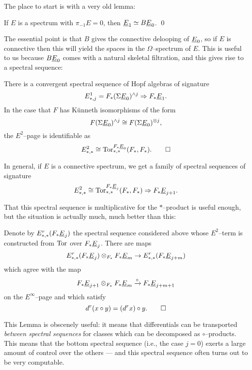 The place to start is with a very old lemma:
\begin{lemma}
If $E$ is a spectrum with $\pi_{-1} E = 0$, then $\underline{\smash{E}}_{1} \simeq B\underline{\smash{E}}_{0}$. \qed
\end{lemma}
\noindent The essential point is that $B$ gives the connective delooping of $\underline{\smash{E}}_{0}$, so if $E$ is connective then this will yield the spaces in the $\Omega$--spectrum of $E$.  This is useful to us because $B\underline{\smash{E}}_{0}$ comes with a natural skeletal filtration, and this gives rise to a spectral sequence:
\begin{corollary}
There is a convergent spectral sequence of Hopf algebras of signature \[E^1_{*, j} = F_*(\Sigma \underline{\smash{E}}_{0})^{\wedge j} \Rightarrow F_* \underline{\smash{E}}_{1}.\]  In the case that $F$ has K\"unneth isomorphisms of the form \[F(\Sigma \underline{\smash{E}}_{0})^{\wedge j} \cong F(\Sigma \underline{\smash{E}}_{0})^{\otimes j},\] the $E^2$--page is identifiable as \[E^2_{*, *} \cong \operatorname{Tor}^{F_* \underline{\smash{E}}_{0}}_{*, *}(F_*, F_*). \qed\]
\end{corollary}
\noindent In general, if $E$ is a connective spectrum, we get a family of spectral sequences of signature \[E^2_{*, *} \cong \operatorname{Tor}^{F_* \underline{\smash{E}}_{j}}_{*, *}(F_*, F_*) \Rightarrow F_* \underline{\smash{E}}_{j+1}.\]

That this spectral sequence is multiplicative for the $\ast$--product is useful enough, but the situation is actually much, much better than this:
\begin{lemma}\label{CircProductAndDifferentials}
Denote by $E^r_{*, *}(F_* \underline{\smash{E}}_{j})$ the spectral sequence considered above whose $E^2$--term is constructed from $\operatorname{Tor}$ over $F_* \underline{\smash{E}}_{j}$.  There are maps \[E^r_{*, *}(F_* \underline{\smash{E}}_{j}) \otimes_{F_*} F_* \underline{\smash{E}}_{m} \to E^r_{*, *}(F_* \underline{\smash{E}}_{j+m})\] which agree with the map \[F_* \underline{\smash{E}}_{j+1} \otimes_{F_*} F_* \underline{\smash{E}}_{m} \xrightarrow{\circ} F_* \underline{\smash{E}}_{j+m+1}\] on the $E^\infty$--page and which satisfy \[d^r(x \circ y) = (d^r x) \circ y. \qed\]
\end{lemma}
\noindent This Lemma is obscenely useful: it means that differentials can be transported \emph{between spectral sequences} for classes which can be decomposed as $\circ$--products.  This means that the bottom spectral sequence (i.e., the case $j = 0$) exerts a large amount of control over the others --- and this spectral sequence often turns out to be very computable.

